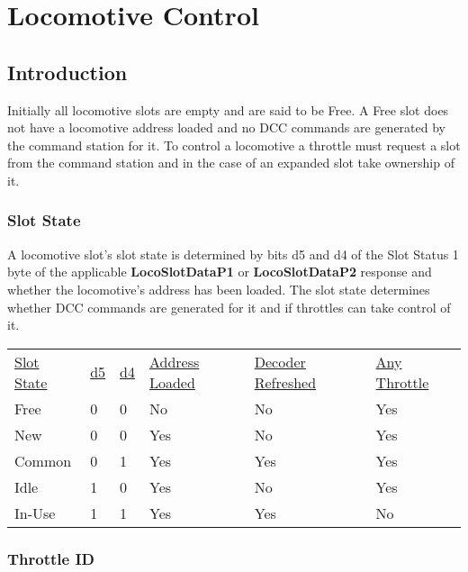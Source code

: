  

\chapter[Locomotive Control]{Locomotive Control}

\section{Introduction}

Initially all locomotive slots are empty and are said to be \gls{Free}. A Free slot does not have a locomotive address loaded and no DCC commands are generated by the command station for it. To control a locomotive a \gls{throttle} must request a slot from the command station and in the case of an expanded slot take ownership of it.

\subsection{Slot State}

A locomotive slot's \gls{slot state} is determined by bits d5 and d4 of the \gls{Slot Status 1} byte of the applicable \textbf{LocoSlotDataP1} or \textbf{LocoSlotDataP2} response and whether the locomotive's address has been loaded. The slot state determines whether DCC commands are generated for it and if throttles can take control of it.

\begin{tabular}{l l l l l l}
\underline{Slot State} & \underline{d5} & \underline{d4} & \underline{Address Loaded} & \underline{Decoder Refreshed} & \underline{Any Throttle}\\
Free & 0 & 0 & No & No & Yes\\
New & 0 & 0 & Yes & No & Yes\\
Common & 0 & 1 & Yes & Yes & Yes\\
Idle & 1 & 0 & Yes & No & Yes\\
In-Use & 1 & 1 & Yes & Yes & No\\
\end{tabular}

\subsection{Throttle ID}

